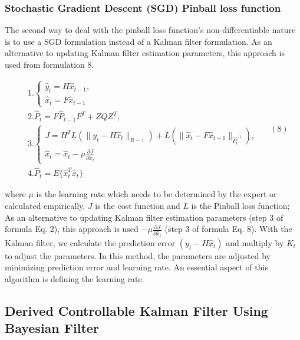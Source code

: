\documentclass[12pt,a4paper]{article}
\begin{document}
	\subsubsection{Stochastic Gradient Descent (SGD) Pinball loss function}
	
	The second way to deal with the pinball loss function's non-differentiable nature is to use a SGD formulation instead of a Kalman filter formulation. As an alternative to updating Kalman filter estimation parameters, this approach is used from formulation 8.
	
	\begin{equation}
		\begin{array}{rl} 
			& 1.\left\{ \begin{array}{ll}\hat{y}_t = H\hat{x}_{t - 1},\\
				\hat{x}_t = F\hat{x}_{t - 1} \end{array} \right.\\
			& 2.\hat{P}_t = F\hat{P}_{t - 1}F^T +ZQZ^T,\\
			& 3.\left\{ \begin{array}{ll}J = H^TL(\| y_t - H\hat{x}_t\|_{R - 1}) + L(\| \hat{x}_t - F\hat{x}_{t - 1}\|_{\hat{P}_t^{- 1}}),\\
				\hat{x}_t = \hat{x}_t - \mu \frac{\partial J}{\partial\hat{x}_t} \end{array} \right.\\
			& 4.\hat{P}_t = E\{\hat{x}_t^T\hat{x}_t\} 
		\end{array} \quad (8)
	\end{equation}
	
	where \(\mu\) is the learning rate which needs to be determined by the expert or calculated empirically, \(J\) is the cost function and \(L\) is the Pinball loss function; As an alternative to updating Kalman filter estimation parameters (step 3 of formula Eq. 2), this approach is used \(- \mu \frac{\partial J}{\partial\hat{x}_t}\) (step 3 of formula Eq. 8). With the Kalman filter, we calculate the prediction error \((y_t - H\hat{x}_t)\) and multiply by \(K_t\) to adjust the parameters. In this method, the parameters are adjusted by minimizing prediction error and learning rate. An essential aspect of this algorithm is defining the learning rate.
	
	\subsection{Derived Controllable Kalman Filter Using Bayesian Filter}
	
\end{document}
